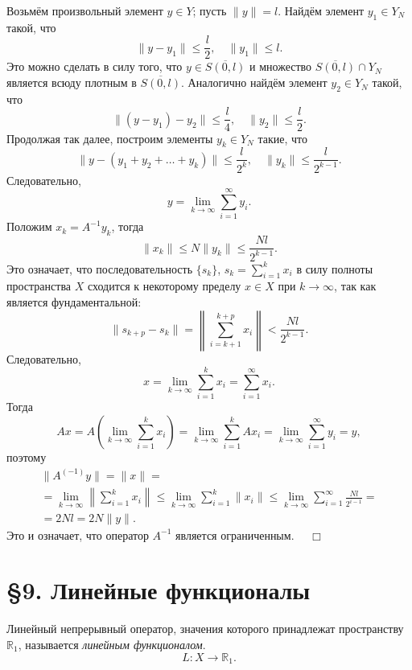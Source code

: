 \documentclass[12pt,a4paper, titlepage]{article}
\begin{document}
Возьмём произвольный элемент $y \in Y$; пусть $ \|y\| = l$. Найдём элемент $y_1 \in Y_N$ такой, что
$$
\|y - y_1\| \leqslant \frac l 2, \quad \|y_1\| \leqslant l.
$$
Это можно сделать в силу того, что $y \in \overline{S(0, l)}$ и множество $\overline{S(0, l)} \cap Y_N$ является всюду плотным в $\overline{S(0, l)}$. Аналогично найдём элемент $y_2 \in Y_N$ такой, что
$$
\|(y - y_1) - y_2\| \leqslant \frac l 4, \quad \|y_2\| \leqslant \frac l 2.
$$
Продолжая так далее, построим элементы $y_k \in Y_N$ такие, что
$$
\|y - (y_1 + y_2 + \dots + y_k)\| \leqslant \frac l {2^k}, \quad \|y_k\| \leqslant \frac l {2^{k-1}}.
$$
Следовательно,
$$
y = \lim_{k\to\infty} \sum_{i = 1}^{\infty} y_i.
$$
Положим $x_k = A^{-1} y_k$, тогда
$$
\|x_k\| \leqslant N \|y_k\| \leqslant \frac {Nl} {2^{k-1}}.
$$
Это означает, что последовательность $\lbrace s_k \rbrace$, $s_k = \sum_{i = 1}^k x_i$ в силу полноты пространства $X$ сходится к некоторому пределу $x \in X$ при $k\to\infty$, так как является фундаментальной:
$$
\|s_{k+p} - s_k\| = \left\| \sum_{i = k+1}^{k+p} x_i \right\| < \frac {Nl} {2^{k-1}}.
$$
Следовательно,
$$
x = \lim_{k\to\infty} \sum_{i=1}^k x_i = \sum_{i=1}^\infty x_i.
$$
Тогда
$$
Ax = A \left( \lim_{k\to\infty} \sum_{i=1}^k x_i \right) = \lim_{k\to\infty} \sum_{i=1}^k Ax_i = \lim_{k\to\infty} \sum_{i = 1}^{\infty} y_i = y,
$$
поэтому
\begin{multline*}
\|A^{(-1)} y\| = \|x\| = \\
= \lim_{k\to\infty} \left\| \sum_{i=1}^k x_i \right\| \leqslant \lim_{k\to\infty} \sum_{i=1}^k \|x_i\| \leqslant
\lim_{k\to\infty} \sum_{i=1}^\infty \frac {Nl} {2^{i-1}} = \\
= 2Nl = 2N \|y\|.
\end{multline*}
Это и означает, что оператор $A^{-1}$ является ограниченным. $\quad \Box$\\












\section*{ \S 9. Линейные функционалы}

Линейный непрерывный оператор, значения которого принадлежат пространству $\mathbb{R}_1$, называется \textit{линейным функционалом}.
$$
L: X \to \mathbb{R}_1.
$$
\end{document}
